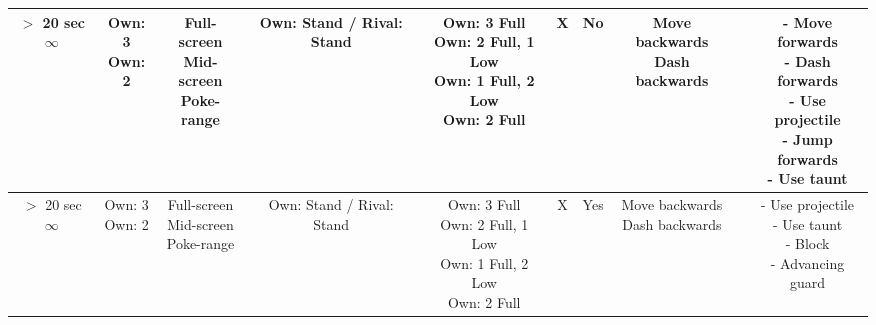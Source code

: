 \documentclass{article}
\begin{document}
\begin{landscape}
\begin{table}[h!]
\begin{center}
\begin{tabular*}{27cm}{c|c|c|c|c|c|c|c|c|c}
     \makecell{$>$ 20 sec \\ $\infty$} & \makecell {Own: 3 \\ Own: 2} & \makecell{Full-screen \\ Mid-screen \\ Poke-range} & Own: Stand / Rival: Stand & \makecell {Own: 3 Full \\ Own: 2 Full, 1 Low \\ Own: 1 Full, 2 Low \\ Own: 2 Full} & X & No & \makecell{Move backwards \\ Dash backwards} & & \makecell{- Move forwards \\ - Dash forwards \\ - Use projectile \\ - Jump forwards \\ - Use taunt}\\
     \hline
     \makecell{$>$ 20 sec \\ $\infty$} & \makecell {Own: 3 \\ Own: 2} & \makecell{Full-screen \\ Mid-screen \\ Poke-range} & Own: Stand / Rival: Stand & \makecell {Own: 3 Full \\ Own: 2 Full, 1 Low \\ Own: 1 Full, 2 Low \\ Own: 2 Full} & X & Yes & \makecell{Move backwards \\ Dash backwards} & & \makecell{- Use projectile \\ - Use taunt \\ - Block \\ - Advancing guard}\\
     \hline
    \end{tabular*}
  \end{center}
\end{table}

\end{landscape}

\newpage  
\end{document}
